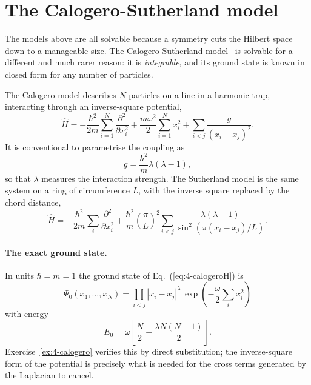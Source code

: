 \section{The Calogero-Sutherland model}
\label{sec:calogero}

The models above are all solvable because a symmetry cuts the Hilbert space
down to a manageable size.  The Calogero-Sutherland
model~\cite{calogero1971,sutherland1971} is solvable for a different and much
rarer reason: it is \emph{integrable}, and its ground state is known in closed
form for any number of particles.

The Calogero model describes $N$ particles on a line in a harmonic trap,
interacting through an inverse-square potential,
\begin{equation}
  \hat{H} = -\frac{\hbar^2}{2m}\sum_{i=1}^{N}
      \frac{\partial^2}{\partial x_i^2}
    + \frac{m\omega^2}{2}\sum_{i=1}^{N}x_i^2
    + \sum_{i<j}\frac{g}{(x_i-x_j)^2} .
  \label{eq:4-calogeroH}
\end{equation}
It is conventional to parametrise the coupling as
\begin{equation}
  g = \frac{\hbar^2}{m}\lambda(\lambda-1),
  \label{eq:4-calogerocoupling}
\end{equation}
so that $\lambda$ measures the interaction strength.  The Sutherland model is
the same system on a ring of circumference $L$, with the inverse square
replaced by the chord distance,
\begin{equation}
  \hat{H} = -\frac{\hbar^2}{2m}\sum_i\frac{\partial^2}{\partial x_i^2}
    + \frac{\hbar^2}{m}\left(\frac{\pi}{L}\right)^2\sum_{i<j}
      \frac{\lambda(\lambda-1)}{\sin^2\!\left(\pi(x_i-x_j)/L\right)} .
  \label{eq:4-sutherlandH}
\end{equation}

\paragraph{The exact ground state.}
In units $\hbar=m=1$ the ground state of Eq.~(\ref{eq:4-calogeroH}) is
\begin{equation}
  \boxed{\;
  \Psi_0(x_1,\dots,x_N)
   = \prod_{i<j}|x_i-x_j|^{\lambda}\,
     \exp\!\left(-\frac{\omega}{2}\sum_i x_i^2\right) \;}
  \label{eq:4-calogeroground}
\end{equation}
with energy
\begin{equation}
  E_0 = \omega\left[\frac{N}{2} + \frac{\lambda N(N-1)}{2}\right] .
  \label{eq:4-calogeroenergy}
\end{equation}
Exercise~\ref{ex:4-calogero} verifies this by direct substitution; the
inverse-square form of the potential is precisely what is needed for the
cross terms generated by the Laplacian to cancel.

